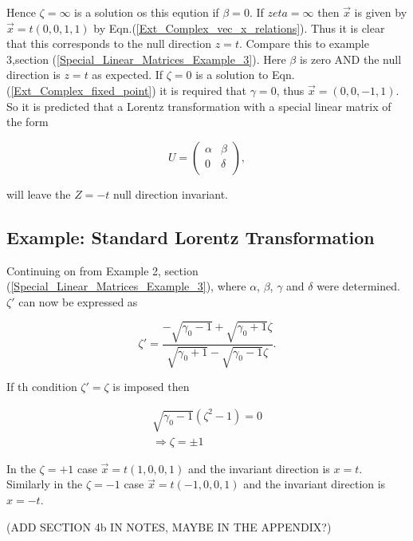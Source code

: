 \noindent Hence $\zeta = \infty$ is a solution os this eqution if $\beta = 0$. If $zeta = \infty$ then $\vec{x}$ is given by $\vec{x} = t(0,0,1,1)$ by Eqn.(\ref{Ext_Complex_vec_x_relations}). Thus it is clear that this corresponds to the null direction $z=t$. Compare this to example 3,section (\ref{Special_Linear_Matrices_Example_3}). Here $\beta$ is zero AND the null direction is $z=t$ as expected. If $\zeta = 0$ is a solution to Eqn.(\ref{Ext_Complex_fixed_point}) it is required that $\gamma = 0$, thus $\vec{x} = (0,0,-1,1)$. So it is predicted that a Lorentz transformation with a special linear matrix of the form

\begin{equation*}   
U = 
\left(
\begin{array}{cc}
\alpha & \beta \\
0 & \delta \\
\end{array}
\right),
\end{equation*}   

\noindent will leave the $Z=-t$ null direction invariant.

\subsection{Example: Standard Lorentz Transformation}

Continuing on from Example 2, section (\ref{Special_Linear_Matrices_Example_3}), where $\alpha$, $\beta$, $\gamma$ and $\delta$ were determined. $\zeta'$ can now be expressed as

\begin{equation*} 
\zeta' = \frac{-\sqrt{\gamma_0 - 1} + \sqrt{\gamma_0 + 1}\zeta}{\sqrt{\gamma_0 + 1} - \sqrt{\gamma_0 - 1}\zeta}.
\end{equation*}

If th condition $\zeta' = \zeta$ is imposed then

\begin{eqnarray*}
\sqrt{\gamma_0 - 1}(\zeta^2 - 1) = 0 \\
\Rightarrow \zeta = \pm 1
\end{eqnarray*}

In the $\zeta = +1$ case $\vec{x} = t(1,0,0,1)$ and the invariant direction is $x=t$. Similarly in the $\zeta = -1$ case $\vec{x} = t(-1,0,0,1)$ and the invariant direction is $x = - t$. 

(ADD SECTION 4b IN NOTES, MAYBE IN THE APPENDIX?)





   












